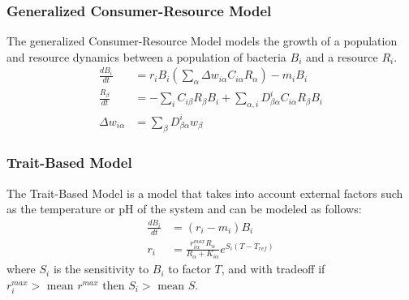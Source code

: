 \subsubsection{Generalized Consumer-Resource Model}
The generalized Consumer-Resource Model models the growth of a population and resource dynamics between a population of bacteria ${B}_i$ and a resource ${R}_i$. 
\begin{align}
    \frac{d{B}_i}{dt} &= r_i{B}_i \left(\sum_{\alpha} \Delta w_{i \alpha}C_{i \alpha}R_{\alpha}\right) - m_i {B}_i \\
    \frac{R_{\beta}}{dt} &= -\sum_i C_{i\beta}R_{\beta}{B_i} + \sum_{\alpha, i}D_{\beta\alpha}^{i}C_{i\alpha}R_{\beta}{B}_i \\
    \Delta w_{i\alpha} &= \sum_{\beta}D_{\beta \alpha}^{i}w_{\beta}
\end{align}

\subsubsection{Trait-Based Model}
The Trait-Based Model is a model that takes into account external factors such as the temperature or pH of the system and can be modeled as follows:  
\begin{align}
    \frac{dB_i}{dt} &= \left(r_i - m_i\right) B_i \\
    r_i &= \frac{r_{i\alpha}^{max}R_\alpha}{R_\alpha + K_{i\alpha}}e^{S_i\left(T-T_{ref}\right)}
\end{align}
where $S_i$ is the sensitivity to $B_i$ to factor $T$, and with tradeoff if $r_i^{max} > \text{ mean } r^{max} \text{ then } S_i > \text{ mean } S$. 

